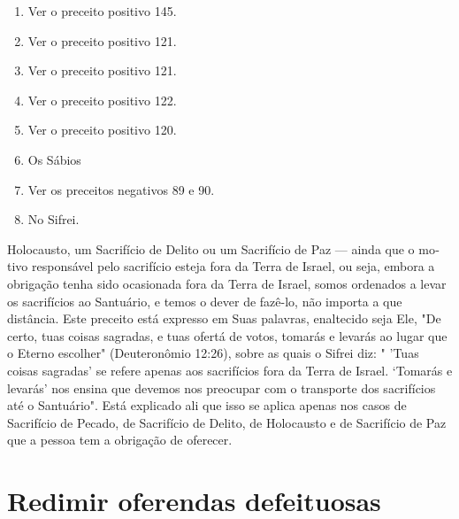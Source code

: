 \begin{enumerate}
\def\labelenumi{\arabic{enumi}.}
\setcounter{enumi}{108}
\item
 
 Ver o preceito positivo 145.
 
\item
 
 Ver o preceito positivo 121.
 
\item
 
 Ver o preceito positivo 121.
 
\item
 
 Ver o preceito positivo 122.
 
\item
 
 Ver o preceito positivo 120.
 
\item
 
 Os Sábios
 
\item
 
 Ver os preceitos negativos 89 e 90.
 
\item
 
 No Sifrei.
 
\end{enumerate}

Holocausto, um Sacrifício de Delito ou um Sacrifício de Paz --- ainda
que o mo­tivo responsável pelo sacrifício esteja fora da Terra de
Israel, ou seja, embora a obrigação tenha sido ocasionada fora da Terra
de Israel, somos ordenados a levar os sacrifícios ao Santuário, e temos
o dever de fazê-lo, não importa a que distância. Este preceito está
expresso em Suas palavras, enaltecido seja Ele, "De certo, tuas coisas
sagradas, e tuas ofertá de votos, tomarás e levarás ao lugar que o
Eterno escolher" (Deuteronômio 12:26), sobre as quais o Sifrei diz: "
'Tuas coisas sagradas' se refere apenas aos sacrifícios fora da Terra de
Israel. `Tomarás e levarás' nos ensina que devemos nos preocupar com o
transporte dos sacrifícios até o Santuário". Está explicado ali que isso
se aplica apenas nos casos de Sacrifício de Pecado, de Sacrifício de
Delito, de Holocausto e de Sacri­fício de Paz que a pessoa tem a
obrigação de oferecer.


\section{Redimir oferendas defeituosas}



